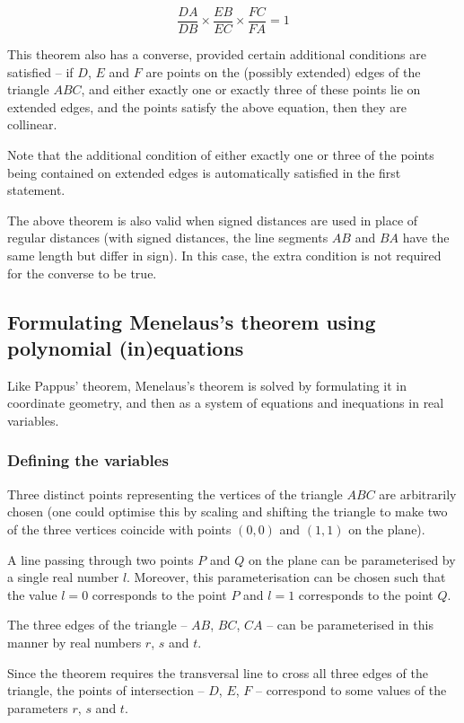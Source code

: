 \documentclass{amsart}
\theoremstyle{plain}
\theoremstyle{definition}
\theoremstyle{remark}
\begin{document}
$$
	\frac{DA}{DB} \times \frac{EB}{EC} \times \frac{FC}{FA} = 1
$$

This theorem also has a converse, provided certain additional conditions are satisfied -- if \(D\), \(E\) and \(F\) are points on the (possibly extended) edges of the triangle \(ABC\), and either exactly one or exactly three of these points lie on extended edges, and the points satisfy the above equation, then they are collinear.

Note that the additional condition of either exactly one or three of the points being contained on extended edges is automatically satisfied in the first statement.

The above theorem is also valid when signed distances are used in place of regular distances (with signed distances, the line segments \(AB\) and \(BA\) have the same length but differ in sign). In this case, the extra condition is not required for the converse to be true.

\subsection{Formulating Menelaus's theorem using polynomial (in)equations}

Like Pappus' theorem, Menelaus's theorem is solved by formulating it in coordinate geometry, and then as a system of equations and inequations in real variables.

\subsubsection{Defining the variables}

Three distinct points representing the vertices of the triangle \(ABC\) are arbitrarily chosen (one could optimise this by scaling and shifting the triangle to make two of the three vertices coincide with points \((0, 0)\) and \((1, 1)\) on the plane).

A line passing through two points \(P\) and \(Q\) on the plane can be parameterised by a single real number \(l\). Moreover, this parameterisation can be chosen such that the value \(l = 0\) corresponds to the point \(P\) and \(l = 1\) corresponds to the point \(Q\).

The three edges of the triangle -- \(AB\), \(BC\), \(CA\) -- can be parameterised in this manner by real numbers \(r\), \(s\) and \(t\).

Since the theorem requires the transversal line to cross all three edges of the triangle, the points of intersection -- \(D\), \(E\), \(F\) -- correspond to some values of the parameters \(r\), \(s\) and \(t\).
\end{document}
